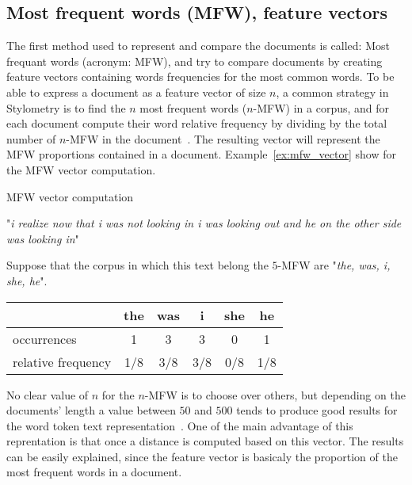 \subsection{Most frequent words (MFW), feature vectors}

The first method used to represent and compare the documents is called: Most frequant words (acronym: MFW), and try to compare documents by creating feature vectors containing words frequencies for the most common words.
To be able to express a document as a feature vector of size $n$, a common strategy in Stylometry is to find the $n$ most frequent words ($n$-MFW) in a corpus, and for each document compute their word relative frequency by dividing by the total number of $n$-MFW in the document~\cite{savoy_stylo}.
The resulting vector will represent the MFW proportions contained in a document.
Example~\ref{ex:mfw_vector} show for the MFW vector computation.

\begin{example}
  \centering
  \caption{MFW vector computation}
  \label{ex:mfw_vector}

  \begin{subexample}{\linewidth}
    "\textit{i realize now that i was not looking in i was looking out and he on the other side was looking in}"\cite{ddlc}
  \end{subexample}

  \vspace{0.5cm}

  \begin{subexample}{\linewidth}
    Suppose that the corpus in which this text belong the $5$-MFW are "\textit{the, was, i, she, he}".

    \centering
    \begin{tabular}{l c c c c c}
      \toprule
                       & the & was & i   & she & he  \\
      \midrule
      occurrences         & 1   & 3   & 3   & 0   & 1   \\
      relative frequency & 1/8 & 3/8 & 3/8 & 0/8 & 1/8 \\
      \bottomrule
    \end{tabular}
  \end{subexample}
\end{example}

No clear value of $n$ for the $n$-MFW is to choose over others, but depending on the documents' length a value between $50$ and $500$ tends to produce good results for the word token text representation~\cite{savoy_text_representation}.
One of the main advantage of this reprentation is that once a distance is computed based on this vector.
The results can be easily explained, since the feature vector is basicaly the proportion of the most frequent words in a document.


